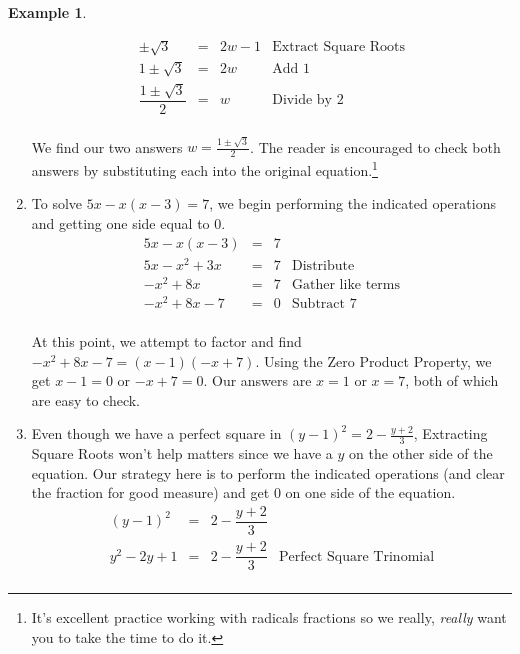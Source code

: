 \documentclass[11pt]{article}
\theoremstyle{definition}  %
\newtheorem{ex}{\bf Example}
\begin{document}
\begin{ex}
\begin{enumerate}
\[\begin{array}{rclr}
\pm \sqrt{3} & = & 2w - 1 & \text{Extract Square Roots} \\

1 \pm \sqrt{3} & = & 2w & \text{Add $1$} \\

\dfrac{1 \pm \sqrt{3}}{2} & = & w & \text{Divide by $2$} \\

\end{array} \]

We find our two answers $w = \frac{1 \pm \sqrt{3}}{2}$.  The reader is encouraged to check both answers by substituting each into the original equation.\footnote{It's excellent  practice working with radicals fractions so we really, \emph{really} want you to take the time to do it.}

\item To solve $5x - x(x-3) = 7$, we begin performing the indicated operations and getting one side equal to $0$.\[ \begin{array}{rclr}

5x - x(x-3) & = & 7 & \\

5x - x^2 + 3x & = & 7 & \text{Distribute} \\

-x^2 + 8x & = & 7 & \text{Gather like terms} \\

-x^2 + 8x - 7 & = & 0& \text{Subtract $7$} \\

\end{array}\]

At this point, we attempt to factor and find $-x^2 + 8x - 7 = (x-1)(-x+7)$.  Using the Zero Product Property, we get $x-1 = 0$  or $-x+7 = 0$.  Our answers are $x = 1$ or $x = 7$, both of which are easy to check.

\item Even though we have a perfect square in $(y-1)^2 = 2 - \frac{y+2}{3}$, Extracting Square Roots won't help matters since we have a $y$ on the other side of the equation.  Our strategy here is to perform the indicated operations (and clear the fraction for good measure) and get $0$ on one side of the equation.\[ \begin{array}{rclr}

(y-1)^2 & = &  2 - \dfrac{y+2}{3} & \\ [8pt]

y^2 - 2y + 1 & = & 2 - \dfrac{y+2}{3} & \text{Perfect Square Trinomial}\\ [8pt]


\end{array}\]
\end{enumerate}
\end{ex}
\end{document}
